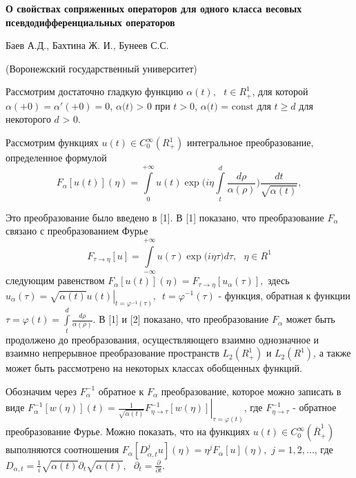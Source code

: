 {
\sloppy
\begin{center}
\textbf{О свойствах сопряженных операторов для одного класса весовых
псевдодифференциальных операторов }
\end{center}

\begin{center}
Баев А.Д., Бахтина Ж. И., Бунеев С.С.
\end{center}

\begin{center}
(Воронежский государственный университет)
\end{center}





Рассмотрим достаточно гладкую функцию $\alpha (t),\,\,\,\,t \in R_ + ^1 $,
для которой $\alpha ( + 0) = {\alpha }'( + 0) = 0$, $\alpha \mbox{(}t\mbox{)
> 0}$ при $t > 0$, $\alpha \mbox{(}t\mbox{) = const}$ для $t \ge d$ для
некоторого $d\mbox{ > 0}$.

Рассмотрим функциях $u(t) \in C_0^\infty (R_ + ^1 )$ интегральное
преобразование, определенное формулой
\begin{equation}
\label{eq4400}
F_\alpha [u(t)](\eta ) = \int\limits_0^{ + \infty } {u(t)\exp (i\eta }
\int\limits_t^d {\frac{d\rho }{\alpha (\rho )}} )\frac{dt}{\sqrt {\alpha
(t)} },
\end{equation}

Это преобразование было введено в [1]. В [1] показано, что преобразование
$F_\alpha $ связано с преобразованием Фурье
\[
F_{\tau \to \eta } [u] = \int\limits_{ - \infty }^{ + \infty } {u(\tau )\exp
(i\eta } \tau )d\tau ,\,\,\,\,\eta \in R^1
\]
следующим равенством $F_\alpha [u(t)](\eta ) = F_{\tau \to \eta } [u_\alpha
(\tau )],$ здесь $u_\alpha (\tau ) = \left. {\sqrt {\alpha (t)} u(t)}
\right|_{t = \varphi ^{ - 1}(\tau )} ,\,\,\,t = \varphi ^{ - 1}(\tau )$ -
функция, обратная к функции $\tau = \varphi (t) = \int\limits_t^d
{\frac{d\rho }{\alpha (\rho )}} .$ В [1] и [2] показано, что преобразование
$F_\alpha $ может быть продолжено до преобразования, осуществляющего взаимно
однозначное и взаимно непрерывное преобразование пространств $L_2 (R_ + ^1
)$ и $L_2 (R^1 )$, а также может быть рассмотрено на некоторых классах
обобщенных функций.

Обозначим через $F_\alpha ^{ - 1} $ обратное к $F_\alpha $ преобразование,
которое можно записать в виде $F_\alpha ^{ - 1} [w(\eta )](t) = \left.
{\frac{1}{\sqrt {\alpha (t)} }F_{\eta \to \tau }^{ - 1} [w(\eta )]}
\right|_{\tau = \varphi (t)} $, где $F_{\eta \to \tau }^{ - 1} $ - обратное
преобразование Фурье. Можно показать, что на функциях $u(t) \in C_0^\infty
(\bar {R}_ + ^1 )$ выполняются соотношения $F_\alpha [D_{\alpha ,t}^j
u](\eta ) = \eta ^jF_\alpha [u](\eta ),\,\,j = 1,2,...$, где $D_{\alpha ,t}
= \frac{1}{i}\sqrt {\alpha (t)} \partial _t \sqrt {\alpha (t)}
,\,\,\,\,\partial _t = \frac{\partial }{\partial t}.$

}

